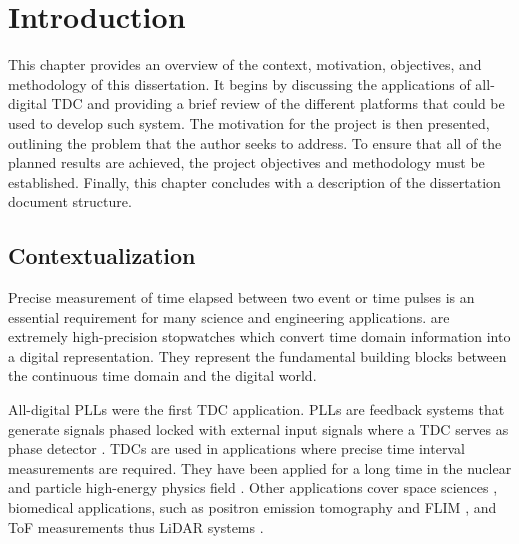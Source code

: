 
\chapter{Introduction} %
\label{cha:introduction}


This chapter provides an overview of the context, motivation, objectives, and methodology of this dissertation. It begins by discussing the applications of all-digital \gls{TDC} and providing a brief review of the different platforms that could be used to develop such system. The motivation for the project is then presented, outlining the problem that the author seeks to address. To ensure that all of the planned results are achieved, the project objectives and methodology must be established. Finally, this chapter concludes with a description of the dissertation document structure.

\section{Contextualization} %
\label{sec:contextualization}

Precise measurement of time elapsed between two event or time pulses is an essential requirement for many science and engineering applications.  are extremely high-precision stopwatches which convert time domain information into a digital representation. They represent the fundamental building blocks between the continuous time domain and the digital world.

All-digital \glspl{PLL} were the first \gls{TDC} application. \glspl{PLL} are feedback systems that generate signals phased locked with external input signals where a \gls{TDC} serves as phase detector \citep{pll}. \glspl{TDC} are used in applications where precise time interval measurements are required. They have been applied for a long time in the nuclear and particle high-energy physics field \citep{physics}. Other applications cover space sciences \citep{space_sciences}, biomedical applications, such as positron emission tomography and \gls{FLIM} \citep{flim}, and \gls{ToF} measurements thus \gls{LiDAR} systems \citep{lidar}.

